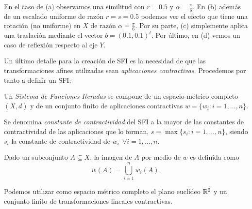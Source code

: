 En el caso de (a) observamos una similitud con $r=0.5$ y $\alpha=\frac{\pi}{6}$. En (b) además de un escalado uniforme de razón $r=s=0.5$ podemos ver el efecto que tiene una rotación (no uniforme) en $X$ de razón $\alpha=\frac{\pi}{6}$. Por su parte, (c) simplemente aplica una traslación mediante el vector $b=(0.1,0.1)^t$. Por último, en (d) vemos un caso de reflexión respecto al eje $Y$.

Un último detalle para la creación de SFI es la necesidad de que las transformaciones afines utilizadas sean \textit{aplicaciones contractivas}. Procedemos por tanto a definir un SFI:

\begin{definicion}
    \label{def:SFI}
    Un \textit{Sistema de Funciones Iteradas} se compone de un espacio métrico completo $(X,d)$ y de un conjunto finito de aplicaciones contractivas $w=\{w_i:i=1,\dots,n\}$.

    Se denomina \textit{constante de contractividad} del SFI a la mayor de las constantes de contractividad de las aplicaciones que lo forman, $s=\max\{s_i:i=1,\dots,n\}$, siendo $s_i$ la constante de contractividad de $w_i \ \ \forall i=1,\dots,n$.

    Dado un subconjunto $A\subseteq X$, la imagen de $A$ por medio de $w$ es definida como
    $$
    w(A)=\bigcup_{i=1}^n w_i(A).
    $$
\end{definicion}

Podemos utilizar como espacio métrico completo el plano euclídeo $\mathbb{R}^2$ y un conjunto finito de transformaciones lineales contractivas.

